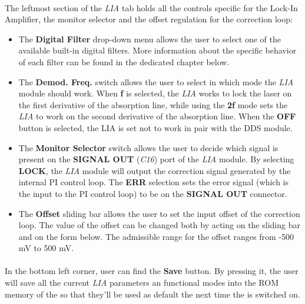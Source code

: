 \paragraph{} The leftmost section of the \textit{LIA} tab holds all the controls specific for the Lock-In Amplifier, the monitor selector and the offset regulation for the correction loop:
\begin{itemize} 
    \item The \textbf{Digital Filter} drop-down menu allows the user to select one of the available built-in digital filters. More information about the specific behavior of each filter can be found in the dedicated chapter below.
    
    \item The \textbf{Demod. Freq.} switch allows the user to select in which mode the \textit{LIA} module should work. When \textbf{f} is selected, the \textit{LIA} works to lock the laser on the first derivative of the absorption line, while using the \textbf{2f} mode sets the \textit{LIA} to work on the second derivative of the absorption line. When the \textbf{OFF} button is selected, the LIA is set not to work in pair with the DDS module.
    
    \item The \textbf{Monitor Selector} switch allows the user to decide which signal is present on the \textbf{SIGNAL OUT} (\textit{C16}) port of the \textit{LIA} module. By selecting \textbf{LOCK}, the \textit{LIA} module will output the correction signal generated by the internal PI control loop. The \textbf{ERR} selection sets the error signal (which is the input to the PI control loop) to be on the \textbf{SIGNAL OUT} connector.
    
    \item The \textbf{Offset} sliding bar allows the user to set the input offset of the correction loop. The value of the offset can be changed both by acting on the sliding bar and on the form below. The admissible range for the offset ranges from -500 mV to 500 mV.
   
\end{itemize}

\paragraph{} In the bottom left corner, user can find the \textbf{Save} button. By pressing it, the user will save all the current \textit{LIA} parameters an functional modes into the ROM memory of the \QubeModel  so that they'll be used as default the next time the \QubeModel  is switched on.

